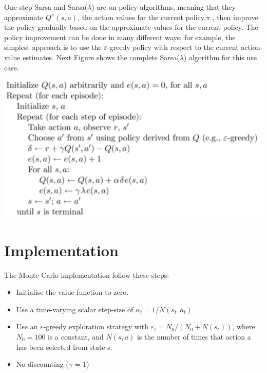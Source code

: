 \documentclass[11pt]{article}
\theoremstyle{plain}
\theoremstyle{definition}
\begin{document}
One-step Sarsa and Sarsa($\lambda $) are on-policy algorithms, meaning that they approximate $Q^\pi(s,a)$, the action values for the current policy,$\pi$ , then improve the policy gradually based on the approximate values for the current policy. The policy improvement can be done in many different ways; for example, the simplest approach is to use the $\varepsilon $-greedy policy with respect to the current action-value estimates. Next Figure shows the complete Sarsa($\lambda $) algorithm for this use case.

\begin{center}
\includegraphics[scale=0.7]{5}
\end{center}

\section{Implementation}
The Monte Carlo implementation follow these steps:
\begin{itemize}
\item Initialise the value function to zero.
\item Use a time-varying scalar step-size of $\alpha_t  = 1/N (s_t , a_t )$
\item Use an $\varepsilon$-greedy exploration strategy with $\varepsilon_t = N_0 /(N_0 + N (s_t))$, where$ N_0 = 100$ is a constant, and $N(s,a)$ is the number of times that action a has been selected from state s.
\item No discounting ($\gamma$ = 1)
\end{itemize}
\end{document}
